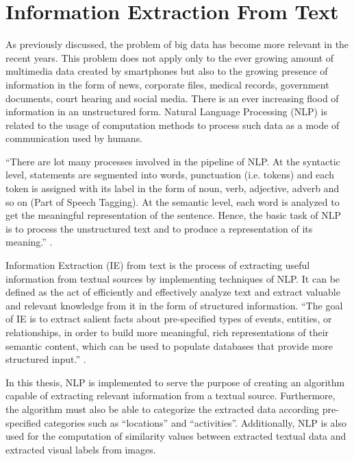 \cleardoublepage


\chapter{Information Extraction From Text}
\label{ch:nlp}

As previously discussed, the problem of big data has become more relevant in the recent years.  This problem does not apply only to the ever growing amount of multimedia data created by smartphones but also to the growing presence of information in the form of news, corporate files, medical records, government documents, court hearing and social media. There is an ever increasing flood of information in an unstructured form. Natural Language Processing (NLP) is related to the usage of computation methods to process such data as a mode of communication used by humans.

``There are lot many processes involved in the pipeline of NLP. At the syntactic level, statements are segmented into words, punctuation (i.e.  tokens) and each token is assigned with its label in the form of noun, verb, adjective, adverb and so on (Part of Speech Tagging).  At the semantic level, each word is analyzed to get the meaningful representation of the sentence.  Hence, the basic task of NLP is to process the unstructured text and to produce a representation of its meaning.''  \cite{singh2018natural}.



Information Extraction (IE) from text is the process of extracting useful information from textual sources by implementing techniques of NLP. It can be defined as the act of efficiently and effectively analyze text and extract valuable and relevant knowledge from it in the form of structured information. ``The goal of IE is to extract salient facts about pre-specified types of events, entities, or relationships, in order to build more meaningful, rich representations of their semantic content, which can be used to populate databases that provide more structured input.'' \cite{singh2018natural}.

In this thesis, NLP is implemented to serve the purpose of creating an algorithm capable of extracting relevant information from a textual source. Furthermore, the algorithm must also be able to categorize the extracted data according pre-specified categories such as \enquote{locations} and \enquote{activities}. Additionally, NLP is also used for the computation of similarity values between extracted textual data and extracted visual labels from images.

